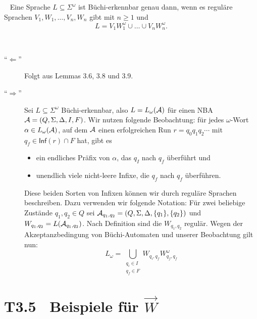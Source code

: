 \documentclass[fontsize=11pt, twoside=false, numbers=autoenddot]{scrbook}
\begin{document}
~
Eine Sprache $L \subseteq \Sigma^\omega$ ist Büchi-erkennbar
genau dann,
wenn es reguläre Sprachen $V_1,W_1,\dots,V_n,W_n$ gibt mit $n \geqslant 1$ und
\[
  L = V_1W_1^\omega \cup \dots \cup V_nW_n^\omega.
\]

\par\vspace*{-.5\baselineskip}
~
%
\begin{description}
  \item[{\boldmath "`$\Leftarrow$"'}]
    Folgt aus Lemmas 3.6, 3.8 und 3.9.
  \item[{\boldmath "`$\Rightarrow$"'}]
    Sei $L \subseteq \Sigma^\omega$ Büchi-erkennbar,
    also $L = L_\omega(\mathcal{A})$ für einen NBA $\mathcal{A} = (Q,\Sigma,\Delta,I,F)$.
    Wir nutzen folgende Beobachtung: für jedes $\omega$-Wort $\alpha \in L_\omega(\mathcal{A})$,
    auf dem $\mathcal{A}$ einen erfolgreichen Run $r = q_0q_1q_2\cdots$
    mit $q_f \in \textsf{Inf}(r) \cap F$ hat, gibt es
    \begin{itemize}
      \item
        ein endliches Präfix von $\alpha$, das $q_I$ nach $q_f$ überführt und
      \item
        unendlich viele nicht-leere Infixe, die $q_f$ nach $q_f$ überführen.
    \end{itemize}
    Diese beiden Sorten von Infixen können wir durch reguläre Sprachen beschreiben.
    Dazu verwenden wir folgende Notation: Für zwei beliebige Zustände $q_1,q_2 \in Q$
    sei $\mathcal{A}_{q_1,q_2} = (Q,\Sigma,\Delta,\{q_1\},\{q_2\})$
    und $W_{q_1,q_2} = L(\mathcal{A}_{q_1,q_2})$.
    Nach Definition sind die $W_{q_1,q_2}$ regulär.
    Wegen der Akzeptanzbedingung von Büchi-Automaten und unserer Beobachtung gilt nun:
    \[
      L_\omega = \bigcup_{\substack{q_i \in I\\q_f \in F}} W_{q_i,q_f} W_{q_f,q_f}^\omega
    \]
    \qedhere
\end{description}

\par\vspace*{-.5\baselineskip}
\section*{T3.5~ Beispiele für {\boldmath $\Vec W$}}
\end{document}
